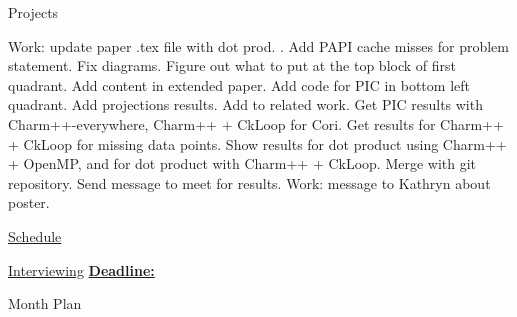 \begin{columns}
\begin{column}{0.10\linewidth}
\begin{block}{Projects}
\begin{enumerate}
\ptask Work: update paper .tex file with dot prod. .
\ptask Add PAPI cache misses for problem statement.
\ptask Fix diagrams.
\ptask Figure out what to put at the top block of first quadrant.
\ptask Add content in extended paper.
\ptask Add code for PIC in bottom left quadrant.
\ptask Add projections results.
\ptask Add to related work.
\ptask Get PIC results with Charm++-everywhere, Charm++ + CkLoop for Cori.
\ptask Get results for Charm++ + CkLoop for missing data points.
\ptask Show results for dot product using Charm++ + OpenMP, and for
dot product with Charm++ + CkLoop.
\pitem Merge with git repository.
\pitem Send message to meet for results.
\pitem Work: message to Kathryn about poster.
\end{enumerate}

\underline{Schedule} \\ 
\begin{enumerate}
\pitem 
\end{enumerate} 
\end{block} 

\underline{Interviewing} 
\underline{\textbf{Deadline:}    }  
\begin{enumerate}
\pitem 
\pitem 
\end{enumerate} 


\begin{block}{Month Plan}

\end{block}


\end{column}
\end{columns}
